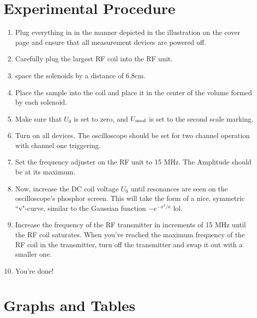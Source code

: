 \documentclass{amsart}
\begin{document}
\section{Experimental Procedure}
\begin{enumerate}
    \item Plug everything in in the manner depicted in the illustration on the cover page and ensure that all measurement devices are powered off.
    \item Carefully plug the largest RF coil into the RF unit.
    \item space the solenoids by a distance of 6.8cm.
    \item Place the sample into the coil and place it in the center of the volume formed by each solenoid.
    \item Make sure that $U_0$ is set to zero, and $U_{\rm mod}$ is set to the second scale marking.
    \item Turn on all devices. The oscilloscope should be set for two channel operation with channel one triggering.
    \item Set the frequency adjuster on the RF unit to 15 MHz. The Amplitude should be at its maximum.
    \item Now, increase the DC coil voltage $U_0$ until resonances are seen on the oscilloscope's phosphor screen. This will take the form of a nice, symmetric ``v"-curve, similar to the Gaussian function $-e^{-x^2/a}$ lol.
    \item Increase the frequency of the RF transmitter in increments of 15 MHz until the RF coil saturates. When you've reached the maximum frequency of the RF coil in the transmitter, turn off the transmitter and swap it out with a smaller one.
    \item You're done!
\end{enumerate}

\section{Graphs and Tables}
\end{document}
